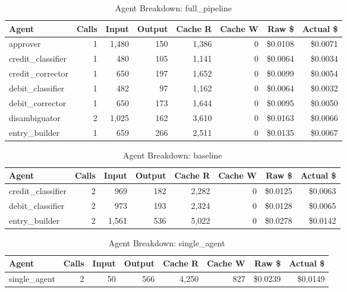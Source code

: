 \begin{table}[htbp]
\centering
\caption{Agent Breakdown: full\_pipeline}
\label{tab:agent-full-pipeline}
\begin{tabular}{l r rr rr rr}
\toprule
Agent & Calls & Input & Output & Cache R & Cache W & Raw \$ & Actual \$ \\
\midrule
  approver & 1 & 1,480 & 150 & 1,386 & 0 & \$0.0108 & \$0.0071 \\
  credit\_classifier & 1 & 480 & 105 & 1,141 & 0 & \$0.0064 & \$0.0034 \\
  credit\_corrector & 1 & 650 & 197 & 1,652 & 0 & \$0.0099 & \$0.0054 \\
  debit\_classifier & 1 & 482 & 97 & 1,162 & 0 & \$0.0064 & \$0.0032 \\
  debit\_corrector & 1 & 650 & 173 & 1,644 & 0 & \$0.0095 & \$0.0050 \\
  disambiguator & 2 & 1,025 & 162 & 3,610 & 0 & \$0.0163 & \$0.0066 \\
  entry\_builder & 1 & 659 & 266 & 2,511 & 0 & \$0.0135 & \$0.0067 \\
\bottomrule
\end{tabular}
\end{table}

\begin{table}[htbp]
\centering
\caption{Agent Breakdown: baseline}
\label{tab:agent-baseline}
\begin{tabular}{l r rr rr rr}
\toprule
Agent & Calls & Input & Output & Cache R & Cache W & Raw \$ & Actual \$ \\
\midrule
  credit\_classifier & 2 & 969 & 182 & 2,282 & 0 & \$0.0125 & \$0.0063 \\
  debit\_classifier & 2 & 973 & 193 & 2,324 & 0 & \$0.0128 & \$0.0065 \\
  entry\_builder & 2 & 1,561 & 536 & 5,022 & 0 & \$0.0278 & \$0.0142 \\
\bottomrule
\end{tabular}
\end{table}

\begin{table}[htbp]
\centering
\caption{Agent Breakdown: single\_agent}
\label{tab:agent-single-agent}
\begin{tabular}{l r rr rr rr}
\toprule
Agent & Calls & Input & Output & Cache R & Cache W & Raw \$ & Actual \$ \\
\midrule
  single\_agent & 2 & 50 & 566 & 4,250 & 827 & \$0.0239 & \$0.0149 \\
\bottomrule
\end{tabular}
\end{table}
